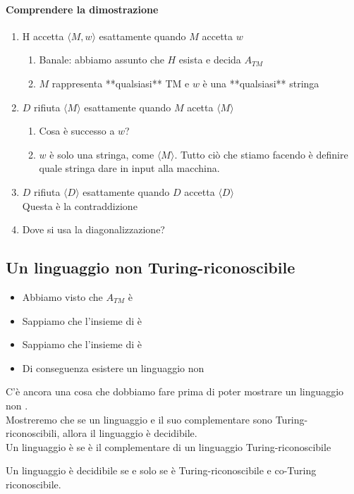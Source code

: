 \paragraph{Comprendere la dimostrazione}
\begin{enumerate}
	\item H accetta $\langle M,w\rangle$ esattamente quando $M$ accetta $w$ 
		\begin{enumerate}
			\item  Banale: abbiamo assunto che $H$ esista e decida $A_{TM}$ 
			\item $M$ rappresenta **qualsiasi** TM e $w$ è una **qualsiasi** stringa 
		\end{enumerate}
	\item $D$ rifiuta $\langle M\rangle$ esattamente quando $M$ acetta $\langle M \rangle$ 
		\begin{enumerate}
			\item Cosa è successo a $w$? 
			\item $w$ è solo una stringa, come $\langle M \rangle$. Tutto ciò che stiamo facendo è definire quale stringa dare in input alla macchina. 
		\end{enumerate}
	\item $D$ rifiuta $\langle D\rangle$ esattamente quando $D$ accetta $\langle D\rangle$ \\
		 Questa è la contraddizione 
	\item Dove si usa la diagonalizzazione? 
\end{enumerate}

\subsection{Un linguaggio non Turing-riconoscibile}
\begin{itemize}
	\item Abbiamo visto che $A_{TM}$ è  
	\item Sappiamo che l'insieme di  è  
	\item Sappiamo che l'insieme di  è  
	\item Di conseguenza  esistere un linguaggio non  
\end{itemize}

C'è ancora una cosa che dobbiamo fare prima di poter mostrare un linguaggio non .\\
Mostreremo che se un linguaggio e il suo complementare sono Turing-riconoscibili, allora il linguaggio è decidibile. \\
Un linguaggio è  se è il complementare di un linguaggio Turing-riconoscibile
\begin{theorem}
	Un linguaggio è decidibile se e solo se è Turing-riconoscibile e co-Turing riconoscibile.
\end{theorem}
